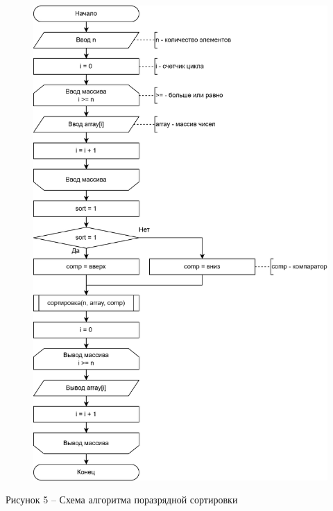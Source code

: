 \documentclass[a4paper,14pt]{extarticle}
\begin{document}
	\pagebreak
	\begin{figure}[h]
		\centering
		\includegraphics[width=0.7\linewidth]{images/s-2-1}
	\end{figure}
	\begin{center}
		Рисунок 5 – Схема алгоритма поразрядной сортировки
	\end{center}
\end{document}
